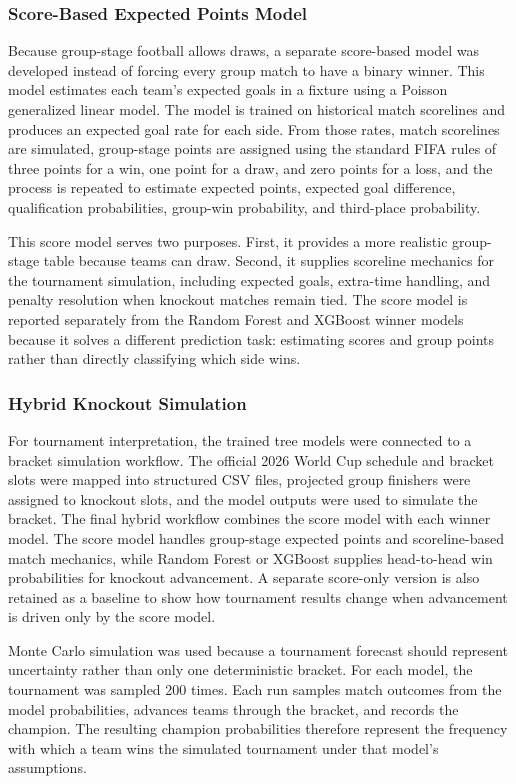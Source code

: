 \documentclass[11pt]{article}
\begin{document}
\subsubsection{Score-Based Expected Points Model}
\label{subsec:score_model}
Because group-stage football allows draws, a separate score-based model was developed instead of forcing every group match to have a binary winner. This model estimates each team's expected goals in a fixture using a Poisson generalized linear model. The model is trained on historical match scorelines and produces an expected goal rate for each side. From those rates, match scorelines are simulated, group-stage points are assigned using the standard FIFA rules of three points for a win, one point for a draw, and zero points for a loss, and the process is repeated to estimate expected points, expected goal difference, qualification probabilities, group-win probability, and third-place probability.

This score model serves two purposes. First, it provides a more realistic group-stage table because teams can draw. Second, it supplies scoreline mechanics for the tournament simulation, including expected goals, extra-time handling, and penalty resolution when knockout matches remain tied. The score model is reported separately from the Random Forest and XGBoost winner models because it solves a different prediction task: estimating scores and group points rather than directly classifying which side wins.

\subsubsection{Hybrid Knockout Simulation}
\label{subsec:hybrid_simulation}
For tournament interpretation, the trained tree models were connected to a bracket simulation workflow. The official 2026 World Cup schedule and bracket slots were mapped into structured CSV files, projected group finishers were assigned to knockout slots, and the model outputs were used to simulate the bracket. The final hybrid workflow combines the score model with each winner model. The score model handles group-stage expected points and scoreline-based match mechanics, while Random Forest or XGBoost supplies head-to-head win probabilities for knockout advancement. A separate score-only version is also retained as a baseline to show how tournament results change when advancement is driven only by the score model.

Monte Carlo simulation was used because a tournament forecast should represent uncertainty rather than only one deterministic bracket. For each model, the tournament was sampled 200 times. Each run samples match outcomes from the model probabilities, advances teams through the bracket, and records the champion. The resulting champion probabilities therefore represent the frequency with which a team wins the simulated tournament under that model's assumptions.
\end{document}
